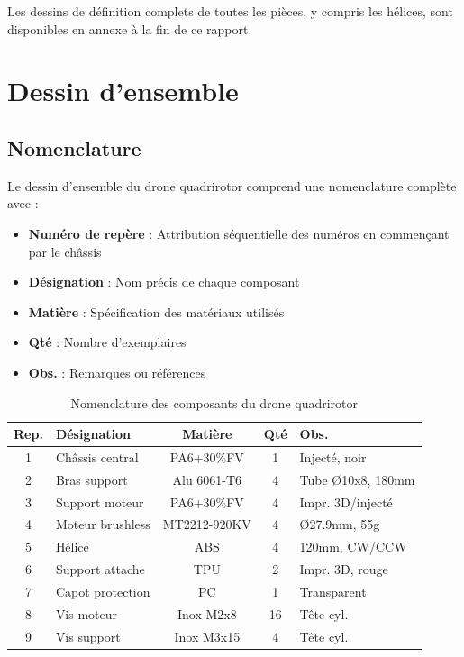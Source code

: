 \documentclass[a4paper,12pt]{report}
\begin{document}
Les dessins de définition complets de toutes les pièces, y compris les hélices, sont disponibles en annexe à la fin de ce rapport.

\chapter{Dessin d'ensemble}
\section{Nomenclature}
Le dessin d'ensemble du drone quadrirotor comprend une nomenclature complète avec :

\begin{itemize}
    \item \textbf{Numéro de repère} : Attribution séquentielle des numéros en commençant par le châssis
    \item \textbf{Désignation} : Nom précis de chaque composant
    \item \textbf{Matière} : Spécification des matériaux utilisés
    \item \textbf{Qté} : Nombre d'exemplaires
    \item \textbf{Obs.} : Remarques ou références
\end{itemize}

\begin{table}[H]
    \centering
    \small
    \caption{Nomenclature des composants du drone quadrirotor}
    \begin{tabular}{|c|l|c|c|l|}
        \hline
        \textbf{Rep.} & \textbf{Désignation} & \textbf{Matière} & \textbf{Qté} & \textbf{Obs.} \\
        \hline
        1 & Châssis central & PA6+30\%FV & 1 & Injecté, noir \\
        2 & Bras support & Alu 6061-T6 & 4 & Tube Ø10x8, 180mm \\
        3 & Support moteur & PA6+30\%FV & 4 & Impr. 3D/injecté \\
        4 & Moteur brushless & MT2212-920KV & 4 & Ø27.9mm, 55g \\
        5 & Hélice & ABS & 4 & 120mm, CW/CCW \\
        6 & Support attache & TPU & 2 & Impr. 3D, rouge \\
        7 & Capot protection & PC & 1 & Transparent \\
        8 & Vis moteur & Inox M2x8 & 16 & Tête cyl. \\
        9 & Vis support & Inox M3x15 & 4 & Tête cyl. \\
        \hline
    \end{tabular}
    \label{tab:nomenclature}
\end{table}
\end{document}
